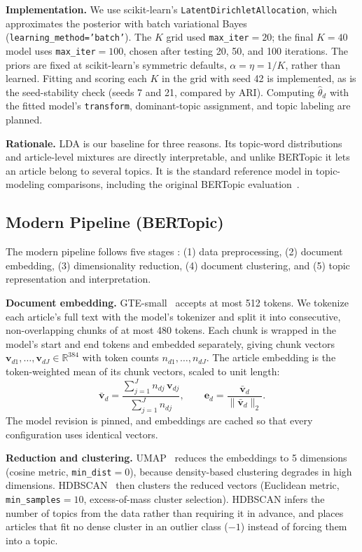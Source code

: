\documentclass[conference]{IEEEtran}
\begin{document}
\textbf{Implementation.} We use scikit-learn's \texttt{LatentDirichletAllocation}, which approximates the posterior with batch variational Bayes (\texttt{learning\_method='batch'}). The $K$ grid used \texttt{max\_iter}$=20$; the final $K=40$ model uses \texttt{max\_iter}$=100$, chosen after testing 20, 50, and 100 iterations. The priors are fixed at scikit-learn's symmetric defaults, $\alpha=\eta=1/K$, rather than learned. Fitting and scoring each $K$ in the grid with seed 42 is implemented, as is the seed-stability check (seeds 7 and 21, compared by ARI). Computing $\hat{\theta}_d$ with the fitted model's \texttt{transform}, dominant-topic assignment, and topic labeling are planned.

\textbf{Rationale.} LDA is our baseline for three reasons. Its topic-word distributions and article-level mixtures are directly interpretable, and unlike BERTopic it lets an article belong to several topics. It is the standard reference model in topic-modeling comparisons, including the original BERTopic evaluation~\cite{grootendorst2022bertopic}. 

\subsection*{Modern Pipeline (BERTopic)}
The modern pipeline follows five stages \cite{alammar2024, kumari2026}: (1) data preprocessing, (2) document embedding, (3) dimensionality reduction, (4) document clustering, and (5) topic representation and interpretation.

\textbf{Document embedding.} GTE-small~\cite{li2023gte} accepts at most 512 tokens. We tokenize each article's full text with the model's tokenizer and split it into consecutive, non-overlapping chunks of at most 480 tokens. Each chunk is wrapped in the model's start and end tokens and embedded separately, giving chunk vectors $\mathbf{v}_{d1},\dots,\mathbf{v}_{dJ}\in\mathbb{R}^{384}$ with token counts $n_{d1},\dots,n_{dJ}$. The article embedding is the token-weighted mean of its chunk vectors, scaled to unit length:
\begin{equation}
\bar{\mathbf{v}}_d = \frac{\sum_{j=1}^{J} n_{dj}\,\mathbf{v}_{dj}}{\sum_{j=1}^{J} n_{dj}}, \qquad
\mathbf{e}_d = \frac{\bar{\mathbf{v}}_d}{\lVert\bar{\mathbf{v}}_d\rVert_2}.
\label{eq:pooling}
\end{equation}
The model revision is pinned, and embeddings are cached so that every configuration uses identical vectors.

\textbf{Reduction and clustering.} UMAP~\cite{mcinnes2018umap} reduces the embeddings to 5 dimensions (cosine metric, \texttt{min\_dist}$=0$), because density-based clustering degrades in high dimensions. HDBSCAN~\cite{campello2013hdbscan} then clusters the reduced vectors (Euclidean metric, \texttt{min\_samples}$=10$, excess-of-mass cluster selection). HDBSCAN infers the number of topics from the data rather than requiring it in advance, and places articles that fit no dense cluster in an outlier class ($-1$) instead of forcing them into a topic.
\end{document}
